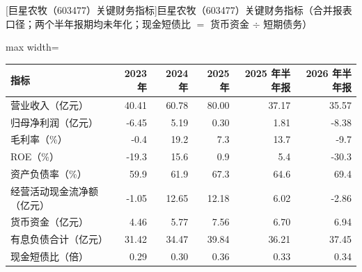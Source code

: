\begin{center}\small\setlength{\tabcolsep}{3.4pt}
[巨星农牧（603477）关键财务指标]{巨星农牧（603477）关键财务指标（合并报表口径；两个半年报期均未年化；现金短债比 $=$ 货币资金 $\div$ 短期债务）}
\begin{adjustbox}{max width=\textwidth}
\begin{tabular}{@{}lrrrrr@{}}
\toprule
指标 & 2023 年 & 2024 年 & 2025 年 & 2025 年半年报 & 2026 年半年报 \\
\midrule
营业收入（亿元） & 40.41 & 60.78 & 80.00 & 37.17 & 35.57 \\
归母净利润（亿元） & -6.45 & 5.19 & 0.30 & 1.81 & -8.38 \\
毛利率（\%） & -0.4 & 19.2 & 7.3 & 13.7 & -9.7 \\
ROE（\%） & -19.3 & 15.6 & 0.9 & 5.4 & -30.3 \\
资产负债率（\%） & 59.9 & 61.9 & 67.3 & 64.6 & 69.4 \\
经营活动现金流净额（亿元） & -1.05 & 12.65 & 12.18 & 6.02 & -2.86 \\
货币资金（亿元） & 4.46 & 5.77 & 7.56 & 6.70 & 6.94 \\
有息负债合计（亿元） & 31.42 & 34.47 & 39.84 & 36.21 & 37.45 \\
现金短债比（倍） & 0.29 & 0.30 & 0.36 & 0.33 & 0.34 \\
\bottomrule
\end{tabular}
\end{adjustbox}
\end{center}

